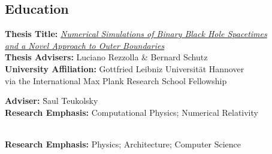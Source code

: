 \documentclass[11pt]{seilercv}
\begin{document}
\begin{textblock}{9.6}
\section{Education}
\vspace{-0.3em}
\vspace{-20pt}
\begin{tabbing}
\textbf{Thesis Title:}\hspace{1.7cm} \= \=\textit{\href{http://jennseiler.com/docs/thesis.pdf}{Numerical Simulations of Binary Black Hole Spacetimes}} \\ 
\>\>\textit{\href{http://jennseiler.com/docs/thesis.pdf}{and a Novel Approach to Outer Boundaries}}\\
\textbf{Thesis Advisers:} \> \>Luciano Rezzolla \& Bernard Schutz \\
\textbf{University Affiliation:} \>Gottfried Leibniz Universit\"{a}t Hannover\\
\> via the International Max Plank Research School Fellowship\\
\end{tabbing}
\vspace{-15pt}
\vspace{-20pt}
\begin{tabbing}
\textbf{Adviser:} \hspace{.9in} \=Saul Teukolsky\\
\textbf{Research Emphasis:} \>Computational Physics; Numerical Relativity\\\
\end{tabbing}
\vspace{-10pt}
\location{Sept 1997 - June 2001}
\textbf{Research Emphasis:} \hspace{.2in} Physics; Architecture; Computer Science \\


\end{textblock}
\end{document}
